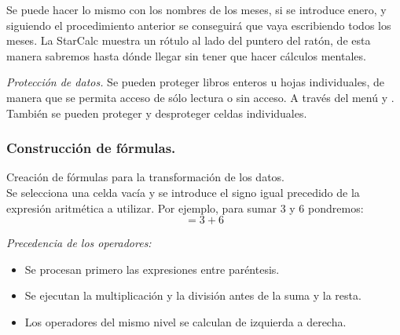 Se puede hacer lo mismo con los nombres de los meses, si se introduce enero, y
siguiendo el procedimiento anterior se conseguirá que vaya escribiendo todos
los meses. 
La StarCalc muestra un rótulo al lado del puntero del ratón, de esta manera
sabremos hasta dónde llegar sin tener que hacer cálculos mentales.

\emph{Protección de datos.} Se pueden proteger libros enteros u hojas
individuales, de manera que  se permita acceso de sólo lectura o sin acceso. A
través del menú   y . 
También se pueden proteger y desproteger celdas individuales. 
 

\subsubsection{Construcción de fórmulas.}
 
Creación de fórmulas para la transformación de los datos.\\ 
 
Se selecciona una celda vacía y se introduce el signo igual precedido de 
la expresión aritmética a utilizar. Por ejemplo, para sumar 3 y 6 pondremos:\\ 
\[=3+6\]
 
\emph{Precedencia de los operadores:}
\begin{itemize} 
\item Se procesan primero las expresiones entre paréntesis. 
\item Se ejecutan la multiplicación y la división antes de la suma y la resta. 
\item Los operadores del mismo nivel se calculan de izquierda a derecha. 
\end{itemize}

